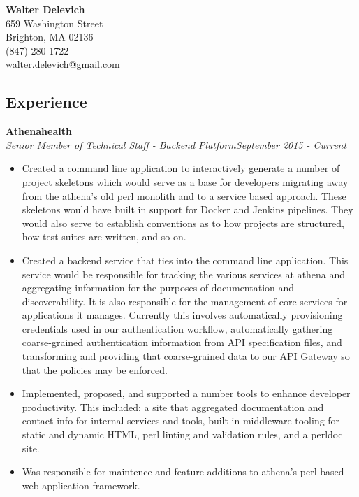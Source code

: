 \documentclass[10pt]{res}
\begin{document}
\thispagestyle{empty} %

\begin{center}
\textbf{\LARGE{Walter Delevich}}\\
659 Washington Street\\
Brighton, MA 02136\\
(847)-280-1722 \\
walter.delevich@gmail.com
\end{center}

\begin{resume}
  
\section{\large{Experience}}
\vspace{8pt} 
\textbf{Athenahealth} \\
{\sl \small{Senior Member of Technical Staff - Backend Platform\hfill September 2015 - Current }}
\vspace{8pt} 
  \begin{itemize} \itemsep -2pt %
    \item Created a command line application to interactively generate a number of project skeletons which would serve as a base for developers migrating away from the athena's old perl monolith and to a service based approach. These skeletons would have built in support for Docker and Jenkins pipelines. They would also serve to establish conventions as to how projects are structured, how test suites are written, and so on.
    \item Created a backend service that ties into the command line application. This service would be responsible for tracking the various services at athena and aggregating information for the purposes of documentation and discoverability. It is also responsible for the management of core services for applications it manages. Currently this involves automatically provisioning credentials used in our authentication workflow, automatically gathering coarse-grained authentication information from API specification files, and transforming and providing that coarse-grained data to our API Gateway so that the policies may be enforced.
    \item Implemented, proposed, and supported a number tools to enhance developer productivity. This included: a site that aggregated documentation and contact info for internal services and tools, built-in middleware tooling for static and dynamic HTML, perl linting and validation rules, and a perldoc site.
    \item Was responsible for maintence and feature additions to athena's perl-based web application framework.
  \end{itemize}


\end{resume}
\end{document}
